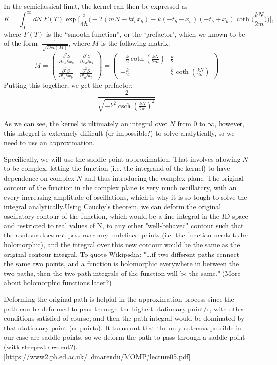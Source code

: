 \documentclass[12pt]{revtex4}
\DeclareMathOperator{\csch}{csch}
\begin{document}
In the semiclassical limit, the kernel can then be expressed as 
\[ K=\int_{0}^{\infty} dN\ F(T) \exp \Bigg[\frac{i}{4 \hbar} \Bigg(-2 (m N - k t_b x_b) - k (-t_b - x_b) (-t_b + x_b) \coth\bigg(\frac{k N}{2 m}\bigg)\Bigg)\Bigg],\]
where $F(T)$ is the ``smooth function'', or the `prefactor', which we known to be of the form: $\frac{1}{\sqrt{Det(M)}}$, where $M$ is the following matrix:
\[ M=\begin{pmatrix}
\frac{\partial^2 S}{\partial x_a \partial x_b} & \frac{\partial^2 S}{\partial x_a \partial t_b} \\ 
\frac{\partial^2 S}{\partial t_a \partial x_b} & \frac{\partial^2 S}{\partial t_a \partial t_b} 
\end{pmatrix} = 
\begin{pmatrix}
-\frac{k}{2}  \coth(\frac{k N}{2 m}) & \frac{k}{2} \\ 
-\frac{k}{2} & \frac{k}{2} \coth(\frac{k N}{2 m})
\end{pmatrix} \]
Putting this together, we get the prefactor:
\[ \frac{2}{\sqrt{-k^2 \csch(\frac{k N}{2 m})^2}} \]

As we can see, the kernel is ultimately an integral over $N$ from 0 to $\infty$, however, this integral is extremely difficult (or impossible?) to solve analytically, so we need to use an approximation.

Specifically, we will use the saddle point approximation. That involves allowing $N$ to be complex, letting the function (i.e. the integrand of the kernel) to have dependence on complex $N$ and thus introducing the complex plane. The original contour of the function in the complex plane is very much oscillatory, with an every increasing amplitude of oscillations, which is why it is so tough to solve the integral analytically.Using Cauchy's theorem, we can deform the original oscillatory contour of the function, which would be a line integral in the 3D-space and restricted to real values of N, to any other "well-behaved" contour such that the contour does not pass over any undefined points (i.e. the function needs to be holomorphic), and the integral over this new contour would be the same as the original contour integral. To quote Wikipedia:  "...if two different paths connect the same two points, and a function is holomorphic everywhere in between the two paths, then the two path integrals of the function will be the same." (More about holomorphic functions later?) 

Deforming the original path is helpful in the approximation process since the path can be deformed to pass through the highest stationary point/s, with other conditions satisfied of course, and then the path integral would be dominated by that stationary point (or points). It turns out that the only extrema possible in our case are saddle points, so we deform the path to pass through a saddle point (with steepest descent?). [https://www2.ph.ed.ac.uk/~dmarendu/MOMP/lecture05.pdf]
\end{document}
